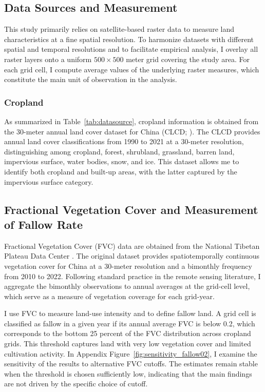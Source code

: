 \subsection{Data Sources and Measurement}

This study primarily relies on satellite-based raster data to measure land characteristics at a fine spatial resolution. To harmonize datasets with different spatial and temporal resolutions and to facilitate empirical analysis, I overlay all raster layers onto a uniform $500 \times 500$ meter grid covering the study area. For each grid cell, I compute average values of the underlying raster measures, which constitute the main unit of observation in the analysis.

\begin{table}[h]
    \centering
    
    \caption{Data Sources}
    \label{tab:datasource}
\end{table}

\subsubsection{Cropland}

As summarized in Table~\ref{tab:datasource}, cropland information is obtained from the 30-meter annual land cover dataset for China (CLCD; \cite{yang2021_30m_landcover_china}). The CLCD provides annual land cover classifications from 1990 to 2021 at a 30-meter resolution, distinguishing among cropland, forest, shrubland, grassland, barren land, impervious surface, water bodies, snow, and ice. This dataset allows me to identify both cropland and built-up areas, with the latter captured by the impervious surface category.

\subsection{Fractional Vegetation Cover and Measurement of Fallow Rate}

Fractional Vegetation Cover (FVC) data are obtained from the National Tibetan Plateau Data Center \citep{zhao2023fractional}. The original dataset provides spatiotemporally continuous vegetation cover for China at a 30-meter resolution and a bimonthly frequency from 2010 to 2022. Following standard practice in the remote sensing literature, I aggregate the bimonthly observations to annual averages at the grid-cell level, which serve as a measure of vegetation coverage for each grid-year.

I use FVC to measure land-use intensity and to define fallow land. A grid cell is classified as fallow in a given year if its annual average FVC is below 0.2, which corresponds to the bottom 25 percent of the FVC distribution across cropland grids. This threshold captures land with very low vegetation cover and limited cultivation activity. In Appendix Figure~\ref{fig:sensitivity_fallow02}, I examine the sensitivity of the results to alternative FVC cutoffs. The estimates remain stable when the threshold is chosen sufficiently low, indicating that the main findings are not driven by the specific choice of cutoff.


